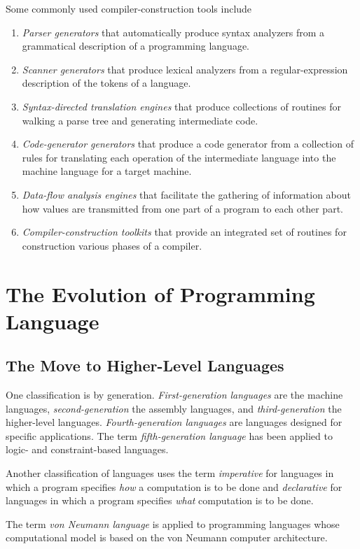 \documentclass[12pt,a4paper,twoside,openany]{book}
\begin{document}
Some commonly used compiler-construction tools include
\begin{enumerate}
    \item \textit{Parser generators} that automatically produce syntax analyzers from a grammatical description of a programming language.
    \item \textit{Scanner generators} that produce lexical analyzers from a regular-expression description of the tokens of a language.
    \item \textit{Syntax-directed translation engines} that produce collections of routines for walking a parse tree and generating intermediate code.
    \item \textit{Code-generator generators} that produce a code generator from a collection of rules for translating each operation of the intermediate language into the machine language for a target machine.
    \item \textit{Data-flow analysis engines} that facilitate the gathering of information about how values are transmitted from one part of a program to each other part.
    \item \textit{Compiler-construction toolkits} that provide an integrated set of routines for construction various phases of a compiler.
\end{enumerate}

\section{The Evolution of Programming Language}
\subsection{The Move to Higher-Level Languages}

One classification is by generation. \textit{First-generation languages} are the machine languages, \textit{second-generation} the assembly languages, and \textit{third-generation} the higher-level languages. \textit{Fourth-generation languages} are languages designed for specific applications. The term \textit{fifth-generation language} has been applied to logic- and constraint-based languages.

Another classification of languages uses the term \textit{imperative} for languages in which a program specifies \textit{how} a computation is to be done and \textit{declarative} for languages in which a program specifies \textit{what} computation is to be done.

The term \textit{von Neumann language} is applied to programming languages whose computational model is based on the von Neumann computer architecture.
\end{document}
